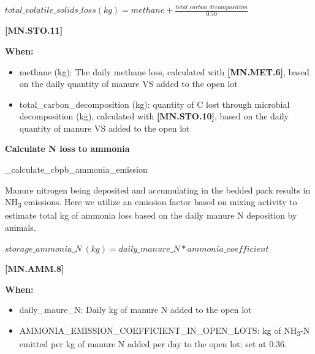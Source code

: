 \begin{refsection}
    \begin{center}
        \(total\_volatile\_solids\_loss (kg) = methane + \frac{total\_carbon\_decomposition}{0.50}\)
    \end{center}
        \vspace{0.5cm} 
    
            {\raggedleft \textbf{[MN.STO.11]}\par}
            \vspace{0.5cm}

        \textbf{When:}

        \begin{itemize}
            \item methane (kg): The daily methane loss, calculated with \textbf{[MN.MET.6]}, based on the daily quantity of manure VS added to the open lot
            \item total\_carbon\_decomposition (kg): quantity of C lost through microbial decomposition (kg), calculated with \textbf{[MN.STO.10]}, based on the daily quantity of manure VS added to the open lot
        \end{itemize}
    \vspace{0.5cm}

    \textbf{Calculate N loss to ammonia}
    \vspace{0.2cm}
    
    \_calculate\_cbpb\_ammonia\_emission
    \vspace{0.2cm}


    Manure nitrogen being deposited and accumulating in the bedded pack results in NH\textsubscript{3} emissions. Here we utilize an emission factor based on mixing activity \parencite{Hanson2024} to estimate total kg of ammonia loss based on the daily manure N deposition by animals. 
        \vspace{0.5cm}        
    
    \begin{center}
        \(storage\_ammonia\_N\ (kg) = daily\_manure\_N * ammonia\_coefficient\)
    \end{center}
        \vspace{0.5cm} 
    
            {\raggedleft \textbf{[MN.AMM.8]}\par}
            \vspace{0.5cm} 
            
    \textbf{When:}

    \begin{itemize}
        \item daily\_maure\_N: Daily kg of manure N added to the open lot
        \item AMMONIA\_EMISSION\_COEFFICIENT\_IN\_OPEN\_LOTS: kg of NH\textsubscript{3}-N emitted per kg of manure N added per day to the open lot; set at 0.36.
    \end{itemize}
    \vspace{0.5cm}


\end{refsection}
